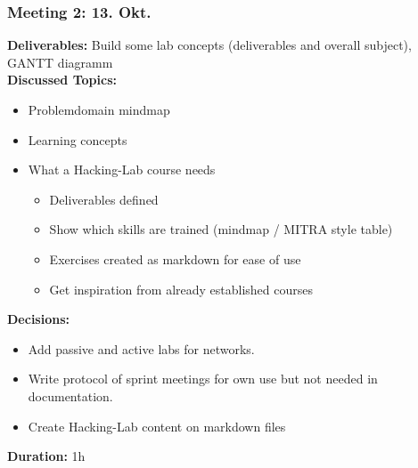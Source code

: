 \subsubsection*{Meeting 2: 13. Okt.}
\textbf{Deliverables:} Build some lab concepts (deliverables and overall subject), GANTT diagramm \\
\textbf{Discussed Topics:} 
\begin{itemize}
    \item Problemdomain mindmap
    \item Learning concepts
    \item What a Hacking-Lab course needs
    \begin{itemize}
        \item Deliverables defined
        \item Show which skills are trained (mindmap / MITRA style table)
        \item Exercises created as markdown for ease of use 
        \item Get inspiration from already established courses
    \end{itemize}
\end{itemize}
\textbf{Decisions:} 
\begin{itemize}
    \item Add passive and active labs for networks.
    \item Write protocol of sprint meetings for own use but not needed in documentation.
    \item Create Hacking-Lab content on markdown files
\end{itemize} 
\textbf{Duration:} 1h

\newpage
